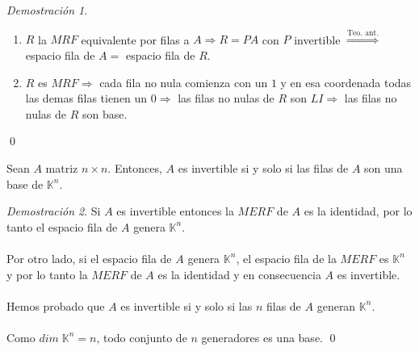 \documentclass{article}
\theoremstyle{definition}
\theoremstyle{definition}
\theoremstyle{remark}
\newtheorem*{demo}{Demostración}
\begin{document}
\begin{demo}\; \begin{enumerate}[label=(\arabic*)]
\item $R$ la $MRF$ equivalente por filas a $A \Rightarrow R = PA$ con $P$ invertible $\overset{\text{Teo. ant.}}{\Rightarrow}$ espacio fila de $A=$ espacio fila de $R$.
\item $R$ es $MRF \Rightarrow$ cada fila no nula comienza con un $1$ y en esa coordenada todas las demas filas tienen un $0 \Rightarrow $ las filas no nulas de $R$ son $LI \Rightarrow $ las filas no nulas de $R$ son base.
\end{enumerate}\qed
\end{demo}
\pagebreak

\begin{corol}
  Sean $A$ matriz $n \times n$. Entonces, $A$ es invertible si y solo si las filas de $A$ son una base de $\mathbb{K}^n$.
\end{corol}
\begin{demo}
  Si $A$ es invertible entonces la $MERF$ de $A$ es la identidad, por lo tanto el espacio fila de $A$ genera $\mathbb{K}^n$. \\\\ Por otro lado, si el espacio fila de $A$ genera $\mathbb{K}^n$, el espacio fila de la $MERF$ es $\mathbb{K}^n$ y por lo tanto la $MERF$ de $A$ es la identidad y en consecuencia $A$ es invertible. \\\\ 
  Hemos probado que $A$ es invertible si y solo si las $n$ filas de $A$ generan $\mathbb{K}^n$. \\\\ Como $dim \; \mathbb{K}^n=n$, todo conjunto de $n$ generadores es una base. \qed
\end{demo}\pagebreak
\end{document}

